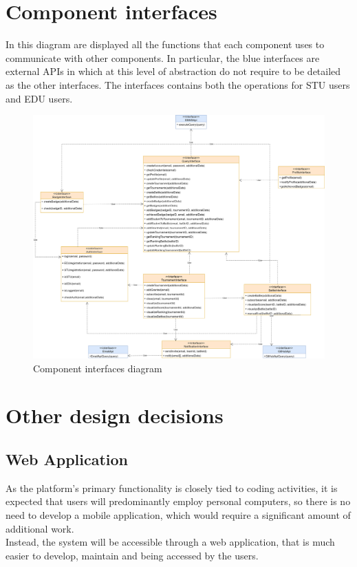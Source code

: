 \section{Component interfaces}
In this diagram are displayed all the functions that each component uses to communicate with other components. In particular, the blue interfaces are external APIs in which at this level of abstraction do not require to be detailed as the other interfaces. The interfaces contains both the operations for STU users and EDU users. 
\begin{figure}[H]
    \centering
    \includegraphics[width=\textwidth]{images/diagrams/ComponentInterfaces.png}
    \caption{Component interfaces diagram}
\end{figure}
\section{Other design decisions}
\subsection{Web Application}
As the platform's primary functionality is closely tied to coding activities, it is expected that users will predominantly employ personal computers, so there is no need to develop a mobile application, which would require a significant amount of additional work.\\
Instead, the system will be accessible through a web application, that is much easier to develop, maintain and being accessed by the users.

